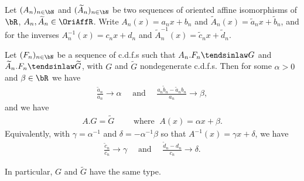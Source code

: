 \begin{corollary}
  \label{cor:convergence-to-types-different-limit}
  Let $(A_n)_{n \in \bN}$ and
  $(\widetilde{A}_n)_{n \in \bN}$ be two sequences of oriented
  affine isomorphisms of $\bR$, $A_n, \widetilde{A}_n \in \OriAffR$.
  Write $A_n(x) = a_n x + b_n$
  and $\widetilde{A}_n(x) = \tilde{a}_n x + \tilde{b}_n$,
  and for the inverses $A_n^{-1}(x) = c_n x + d_n$
  and $\widetilde{A}^{-1}_n(x) = \tilde{c}_n x + \tilde{d}_n$.

  Let $(F_n)_{n \in \bN}$ be a sequence of c.d.f.s
  such that $A_n.F_n \tendsinlaw G$ and
  $\widetilde{A}_n.F_n \tendsinlaw \widetilde{G}$, with
  $G$ and $\widetilde{G}$ nondegenerate c.d.f.s.
  Then for some $\alpha>0$ and $\beta \in \bR$ we have
  \begin{align*}
    \frac{\tilde{a}_n}{a_n} \to \alpha
    \quad \text{ and } \quad
    \frac{a_n \tilde{b}_n - \tilde{a}_n b_n}{a_n} \to \beta,
  \end{align*}
  and we have
  \begin{align*}
    A.G = \widetilde{G}
    \qquad \text{ where } \; A(x) = \alpha x + \beta .
  \end{align*}
  Equivalently, with $\gamma = \alpha^{-1}$ and $\delta = -\alpha^{-1} \beta$
  so that $A^{-1}(x) = \gamma x + \delta$, we have
  \begin{align*}
    \frac{\tilde{c}_n}{c_n} \to \gamma
    \quad \text{ and } \quad
    \frac{\tilde{d}_n - d_n}{c_n} \to \delta .
  \end{align*}

  In particular, $G$ and $\widetilde{G}$ have the same type.
\end{corollary}
